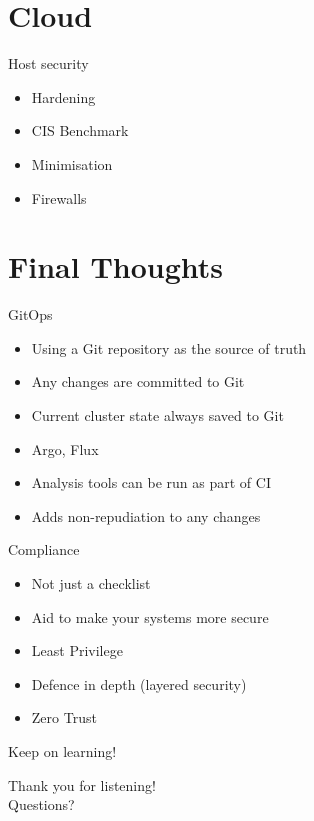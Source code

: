 \documentclass{dcpresentation}
\begin{document}
\section{Cloud}

\begin{frame}{Host security}
  \begin{itemize}
  \item Hardening
  \item CIS Benchmark
  \item Minimisation
  \item Firewalls
  \end{itemize}
\end{frame}

\section{Final Thoughts}

\begin{frame}{GitOps}
 \begin{itemize}
  \item Using a Git repository as the source of truth
  \item Any changes are committed to Git
  \item Current cluster state always saved to Git
  \item Argo, Flux
  \item Analysis tools can be run as part of CI
  \item Adds non-repudiation to any changes
 \end{itemize}
\end{frame}

\begin{frame}{Compliance}
  \begin{itemize}
  \item Not just a checklist
  \item Aid to make your systems more secure 
  \end{itemize}
\end{frame}

\begin{frame}
  \begin{itemize}
  \item Least Privilege
  \item Defence in depth (layered security)
  \item Zero Trust
  \end{itemize}
\end{frame}

\begin{frame}
 \begin{center}
  \LARGE Keep on learning!
 \end{center}  
\end{frame}

\begin{frame}
 \begin{center}
  \LARGE Thank you for listening!\\
  \vspace{30pt}
  \Large Questions?
 \end{center}  
\end{frame}
\end{document}
